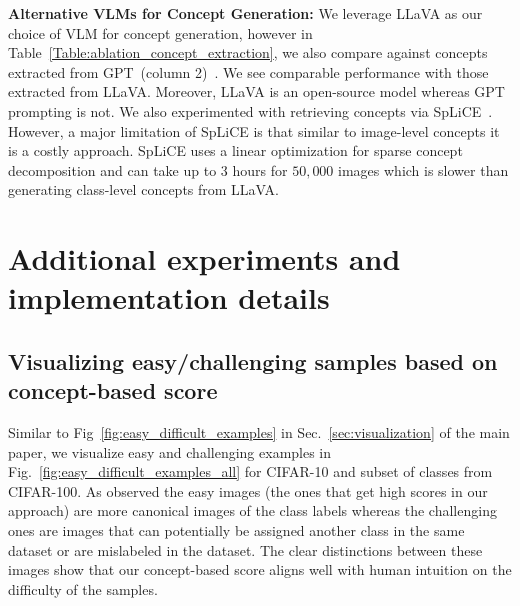 \noindent\textbf{Alternative VLMs for Concept Generation: } We leverage LLaVA as our choice of VLM for concept generation, however in Table~\ref{Table:ablation_concept_extraction}, we also compare against concepts extracted from GPT~(column 2)~\cite{yan2023learning}. 
We see comparable performance with those extracted from LLaVA. Moreover, LLaVA is an open-source model whereas GPT prompting is not. We also experimented with retrieving concepts via SpLiCE~\cite{bhalla2024interpreting}.
However, a major limitation of SpLiCE is that similar to image-level concepts it is a costly approach. SpLiCE uses a linear optimization for sparse concept decomposition and can take up to 3 hours for $50,000$ images which is slower than generating class-level concepts from LLaVA.  

% 
%
\section{Additional experiments and implementation details}
\label{app:implementation_details}

\subsection{Visualizing easy/challenging samples based on concept-based score}
\label{app:visualization}
Similar to Fig~\ref{fig:easy_difficult_examples} in Sec.~\ref{sec:visualization} of the main paper, we visualize easy and challenging examples in Fig.~\ref{fig:easy_difficult_examples_all} for CIFAR-10 and subset of classes from CIFAR-100. 
As observed the easy images (the ones that get high scores in our approach) are more canonical images of the class labels whereas the challenging ones are images that can potentially be assigned another class in the same dataset or are mislabeled in the dataset.
The clear distinctions between these images show that our concept-based score aligns well with human intuition on the difficulty of the samples.


